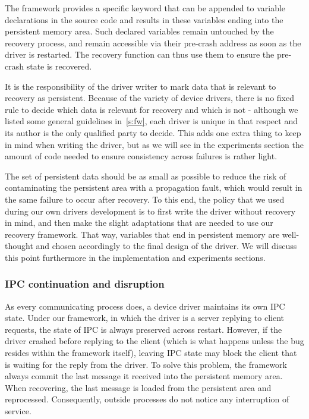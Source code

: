 \documentclass[times, 10pt, twocolumn]{article}
\begin{document}
The framework provides a specific keyword that can be appended to variable declarations in the source code and results in these variables ending into the persistent memory area. Such declared variables remain untouched by the recovery process, and remain accessible via their pre-crash address as soon as the driver is restarted. The recovery function can thus use them to ensure the pre-crash state is recovered.

It is the responsibility of the driver writer to mark data that is relevant to recovery as persistent. Because of the variety of device drivers, there is no fixed rule to decide which data is relevant for recovery and which is not - although we listed some general guidelines in~\ref{s:fw}, each driver is unique in that respect and its author is the only qualified party to decide. This adds one extra thing to keep in mind when writing the driver, but as we will see in the experiments section the amount of code needed to ensure consistency across failures is rather light.

The set of persistent data should be as small as possible to reduce the risk of contaminating the persistent area with a propagation fault, which would result in the same failure to occur after recovery. To this end, the policy that we used during our own drivers development is to first write the driver without recovery in mind, and then make the slight adaptations that are needed to use our recovery framework. That way, variables that end in persistent memory are well-thought and chosen accordingly to the final design of the driver. We will discuss this point furthermore in the implementation and experiments sections.


\subsubsection{IPC continuation and disruption}
As every communicating process does, a device driver maintains its own IPC state.  Under our framework, in which the driver is a server replying to client requests, the state of IPC is always preserved across restart.  However, if the driver crashed before replying to the client (which is what happens unless the bug resides within the framework itself), leaving IPC state may block the client that is waiting for the reply from the driver.  To solve this problem, the framework always commit the last message it received into the persistent memory area.  When recovering, the last message is loaded from the persistent area and reprocessed. Consequently, outside processes do not notice any interruption of service.
\end{document}

